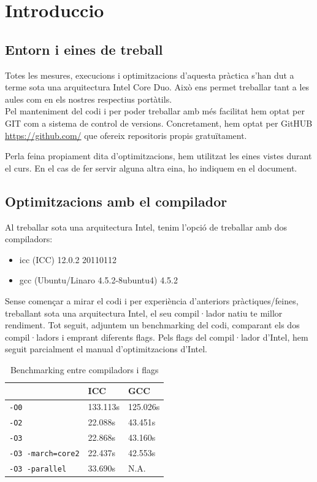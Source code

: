 \chapter{Introduccio}

\section{Entorn i eines de treball}
Totes les mesures, execucions i optimitzacions d'aquesta pràctica s'han dut a terme sota una arquitectura Intel Core Duo. Això ens permet treballar tant a les aules com en els nostres respectius portàtils.\\

Pel manteniment del codi i per poder treballar amb més facilitat hem optat per GIT com a sistema de control de versions. Concretament, hem optat per GitHUB \url{https://github.com/} que ofereix repositoris propis gratuïtament.

Perla feina propiament dita d'optimitzacions, hem utilitzat les eines vistes durant el curs. En el cas de fer servir alguna altra eina, ho indiquem en el document.

\section{Optimitzacions amb el compilador}
Al treballar sota una arquitectura Intel, tenim l'opció de treballar amb dos compiladors:

\begin{itemize}
  \item icc (ICC) 12.0.2 20110112
  \item gcc (Ubuntu/Linaro 4.5.2-8ubuntu4) 4.5.2
\end{itemize}

Sense començar a mirar el codi i per experiència d'anteriors pràctiques/feines, treballant sota una arquitectura Intel, el seu compil·lador natiu te millor rendiment. Tot seguit, adjuntem un benchmarking del codi, comparant els dos compil·ladors i emprant diferents flags. Pels flags del compil·lador d'Intel, hem seguit parcialment el manual d'optimitzacions d'Intel.

\begin{table}
\begin{center}
\begin{tabular}{lll}
\hline
 & ICC & GCC \\
\hline
\texttt{-O0} & 133.113s & 125.026s \\
\texttt{-O2} & 22.088s & 43.451s \\
\texttt{-O3} & 22.868s & 43.160s \\
\texttt{-O3 -march=core2} & 22.437s & 42.553s \\
\texttt{-O3 -parallel} & 33.690s & N.A.\\
\hline
\end{tabular}
\caption{Benchmarking entre compiladors i flags}
\end{center}
\label{table1}
\end{table}

